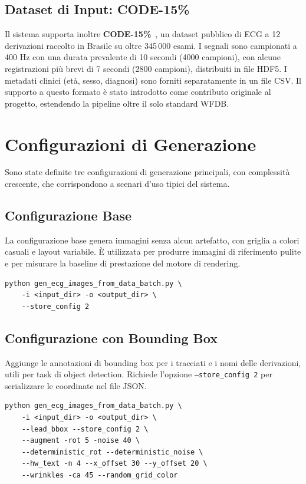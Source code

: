 \subsection{Dataset di Input: CODE-15\%}

Il sistema supporta inoltre \textbf{CODE-15\%}~\cite{ribeiro_2021_4916206}, un dataset pubblico di ECG a 12 derivazioni raccolto in Brasile su oltre 345\,000 esami. I segnali sono campionati a 400 Hz con una durata prevalente di 10 secondi (4000 campioni), con alcune registrazioni più brevi di 7 secondi (2800 campioni), distribuiti in file HDF5. I metadati clinici (età, sesso, diagnosi) sono forniti separatamente in un file CSV. Il supporto a questo formato è stato introdotto come contributo originale al progetto, estendendo la pipeline oltre il solo standard WFDB.

\section{Configurazioni di Generazione}

Sono state definite tre configurazioni di generazione principali, con complessità crescente, che corrispondono a scenari d'uso tipici del sistema.

\subsection{Configurazione Base}

La configurazione base genera immagini senza alcun artefatto, con griglia a colori casuali e layout variabile. È utilizzata per produrre immagini di riferimento pulite e per misurare la baseline di prestazione del motore di rendering.

\begin{verbatim}
python gen_ecg_images_from_data_batch.py \
    -i <input_dir> -o <output_dir> \
    --store_config 2
\end{verbatim}

\subsection{Configurazione con Bounding Box}

Aggiunge le annotazioni di bounding box per i tracciati e i nomi delle derivazioni, utili per task di object detection. Richiede l'opzione \texttt{--store\_config 2} per serializzare le coordinate nel file JSON.

\begin{verbatim}
python gen_ecg_images_from_data_batch.py \
    -i <input_dir> -o <output_dir> \
    --lead_bbox --store_config 2 \
    --augment -rot 5 -noise 40 \
    --deterministic_rot --deterministic_noise \
    --hw_text -n 4 --x_offset 30 --y_offset 20 \
    --wrinkles -ca 45 --random_grid_color
\end{verbatim}

